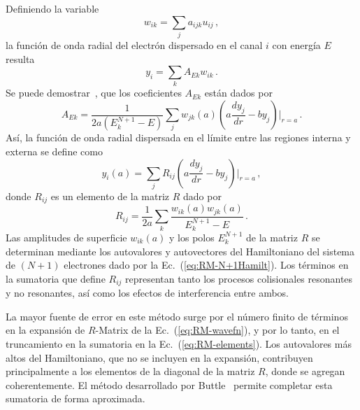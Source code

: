 Definiendo la variable
\begin{equation}
w_{ik}=\sum_j a_{ijk}u_{ij}\,,
\end{equation}
la función de onda radial del electrón dispersado en el canal $i$ con 
energía $E$ resulta
\begin{equation}
y_i=\sum_kA_{Ek}w_{ik}\,.
\end{equation}
Se puede demostrar~\cite{Burke:75}, que los coeficientes $A_{Ek}$ 
están dados por
\begin{equation}
A_{Ek}=\frac{1}{2a\left(E_k^{N+1}-E\right)}\sum_jw_{jk}(a)
\left(a\frac{dy_j}{dr}-by_j\right)\bigg|_{r=a}\,.
\end{equation}
Así, la función de onda radial dispersada en el límite entre las 
regiones interna y externa se define como
\begin{equation}
y_i(a)=\sum_j R_{ij}\left(a\frac{dy_j}{dr}-by_j\right)\bigg|_{r=a}\,,
\end{equation}
donde $R_{ij}$ es un elemento de la matriz $R$ dado por
\begin{equation}
R_{ij} = \frac{1}{2a}\sum_k\frac{w_{ik}(a)w_{jk}(a)}{E_k^{N+1}-E}\,.
\label{eq:RM-elements}
\end{equation}
Las amplitudes de superficie $w_{ik}(a)$ y los polos $E_k^{N+1}$ de la 
matriz $R$ se determinan mediante los autovalores y autovectores del 
Hamiltoniano del sistema de $(N+1)$ electrones dado por la 
Ec.~(\ref{eq:RM-N+1Hamilt}). Los términos en la sumatoria que define 
$R_{ij}$ representan tanto los procesos colisionales resonantes y no 
resonantes, así como los efectos de interferencia entre ambos.

La mayor fuente de error en este método surge por el número finito de 
términos en la expansión de $R$-Matrix de la Ec.~(\ref{eq:RM-wavefn}), y 
por lo tanto, en el truncamiento en la sumatoria en la 
Ec.~(\ref{eq:RM-elements}). Los autovalores más altos del Hamiltoniano,
que no se incluyen en la expansión, contribuyen principalmente a los 
elementos de la diagonal de la matriz $R$, donde se agregan 
coherentemente. El método desarrollado por Buttle~\cite{Buttle:67} 
permite completar esta sumatoria de forma aproximada. 

